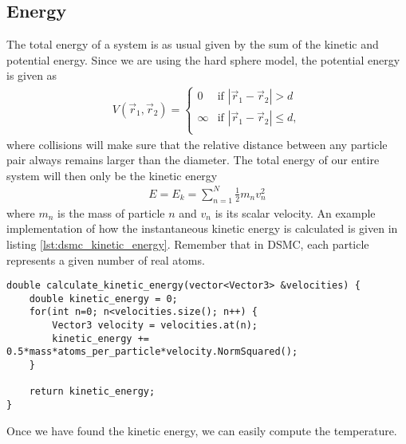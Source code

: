 \subsection{Energy}
The total energy of a system is as usual given by the sum of the kinetic and potential energy. Since we are using the hard sphere model, the potential energy is given as
\begin{align}
	V(\vec r_1, \vec r_2) = \left\{
	\begin{array}{lr}
	0 & \text{if } |\vec r_1  - \vec r_2| > d\\
	\infty & \text{if } |\vec r_1  - \vec r_2| \leq d,\\
	\end{array}
	\right .
\end{align}
where collisions will make sure that the relative distance between any particle pair always remains larger than the diameter. The total energy of our entire system will then only be the kinetic energy
\begin{align}
	E = E_k = \sum_{n=1}^N \frac{1}{2}m_nv_n^2
\end{align}
where $m_n$ is the mass of particle $n$ and $v_n$ is its scalar velocity. An example implementation of how the instantaneous kinetic energy is calculated is given in listing \ref{lst:dsmc_kinetic_energy}. Remember that in DSMC, each particle represents a given number of real atoms.

\begin{lstlisting}[caption=Calculation of kinetic energy., label=lst:dsmc_kinetic_energy]
double calculate_kinetic_energy(vector<Vector3> &velocities) {
	double kinetic_energy = 0;
	for(int n=0; n<velocities.size(); n++) {
		Vector3 velocity = velocities.at(n);
		kinetic_energy += 0.5*mass*atoms_per_particle*velocity.NormSquared();
	}

	return kinetic_energy;
}
\end{lstlisting}
Once we have found the kinetic energy, we can easily compute the temperature.
